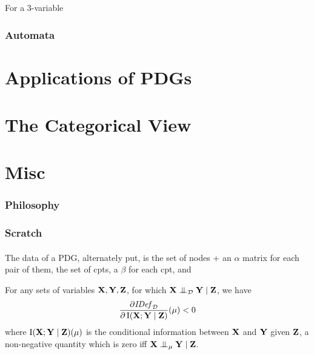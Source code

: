 \documentclass{article}
\begin{document}
    \begin{example}
        For a 3-variable
    \end{example}



	
	

	\section{Automata}

	\part{Applications of PDGs}
	\part{The Categorical View}

	\part{Misc}
	\section{Philosophy}
	\section{Scratch}

	\begin{inactive}
		\subsection{}
		The data of a PDG, alternately put, is the set of nodes + an $\alpha$ matrix for each pair of them, the set of cpts, a $\beta$ for each cpt, and

		\begin{prop}
			For any sets of variables $\mathbf X, \mathbf Y, \mathbf Z$, for which $\mathbf X \mathrel{\perp\mspace{-10mu}\perp}_{\mathcal D} \mathbf Y \mid \mathbf Z$, we have
			\[ \frac{\partial \mathit{IDef}_{\cal D}}{\partial \operatorname{\mathrm{I}}(\mathbf X; \mathbf Y \mid \mathbf Z)}(\mu) < 0 \]
			where $\operatorname{\mathrm{I}}(\mathbf X; \mathbf Y \mid \mathbf Z)(\mu)$ is the conditional information between $\mathbf X$ and $\mathbf Y$ given $\mathbf Z$, a non-negative quantity which is zero iff $\mathbf X \mathrel{\perp\mspace{-10mu}\perp}_{\mu} \mathbf Y \mid \mathbf Z$.
		\end{prop}
	\end{inactive}
\end{document}
